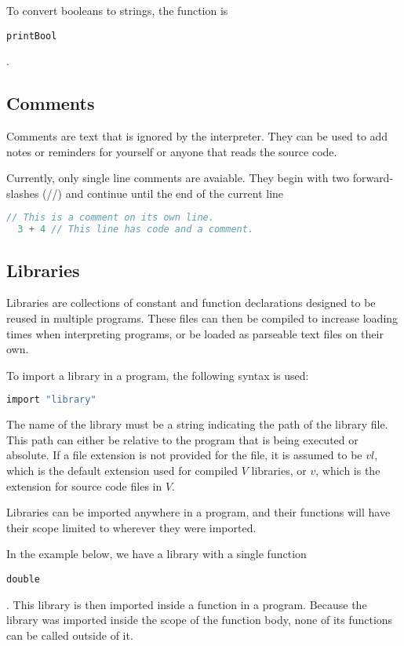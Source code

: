 \documentclass{article}
\def\code#1{\begin{footnotesize}\texttt{#1}\end{footnotesize}}
\begin{document}
To convert booleans to strings, the function is \code{printBool}.

\subsection{Comments}
Comments are text that is ignored by the interpreter.
They can be used to add notes or reminders for yourself or anyone that reads the source code.

Currently, only single line comments are avaiable.
They begin with two forward-slashes (//) and continue until the end of the current line

\begin{lstlisting}[language=V]
  // This is a comment on its own line.
  3 + 4 // This line has code and a comment.
\end{lstlisting}

\subsection{Libraries}

Libraries are collections of constant and function declarations designed to be reused in multiple programs.
These files can then be compiled to increase loading times when interpreting programs, or be loaded as parseable text files on their own.

To import a library in a program, the following syntax is used:

\begin{lstlisting}[language=V]
  import "library"
\end{lstlisting}

The name of the library must be a string indicating the path of the library file.
This path can either be relative to the program that is being executed or absolute.
If a file extension is not provided for the file, it is assumed to be $vl$, which is the default extension used for compiled $V$ libraries, or $v$, which is  the extension for source code files in $V$.

Libraries can be imported anywhere in a program, and their functions will have their scope limited to wherever they were imported.

In the example below, we have a library with a single function \code{double}.
This library is then imported inside a function in a program.
Because the library was imported inside the scope of the function body, none of its functions can be called outside of it.
\end{document}
